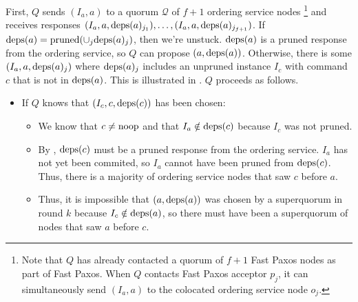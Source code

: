 First, $Q$ sends $(I_a, a)$ to a quorum $\mathcal{Q}$ of $f + 1$ ordering
service nodes%
\footnote{%
  Note that $Q$ has already contacted a quorum of $f + 1$ Fast Paxos nodes as
  part of Fast Paxos. When $Q$ contacts Fast Paxos acceptor $p_j$, it can
  simultaneously send $(I_a, a)$ to the colocated ordering service node $o_j$.
}
and receives responses $(I_a, a, \text{deps}(a)_{j_1}), \ldots, (I_a, a,
\text{deps}(a)_{j_{f+1}})$. If $\text{deps}(a) = \text{pruned}(\cup_j \text{deps}(a)_j)$, then we're
unstuck. $\text{deps}(a)$ is a pruned response from the ordering service, so $Q$ can
propose $(a, \text{deps}(a))$.
%
Otherwise, there is some $(I_a, a, \text{deps}(a)_j)$ where $\text{deps}(a)_j$ includes an
unpruned instance $I_c$ with command $c$ that is not in $\text{deps}(a)$. This is
illustrated in . $Q$ proceeds as follows.
\begin{itemize}
  \item
    If $Q$ knows that $(I_c, c, \text{deps}(c))$ has been chosen:
    \begin{itemize}
      \item
        We know that $c \neq \text{noop}$ and that $I_a \notin \text{deps}(c)$ because
        $I_c$ was not pruned.

      \item
        By , $\text{deps}(c)$ must be a pruned response
        from the ordering service. $I_a$ has not yet been commited, so $I_a$
        cannot have been pruned from $\text{deps}(c)$. Thus, there is a majority of
        ordering service nodes that saw $c$ before $a$.

      \item
        Thus, it is impossible that $(a, \text{deps}(a))$ was chosen by a superquorum
        in round $k$ because $I_c \notin \text{deps}(a)$, so there must have been a
        superquorum of nodes that saw $a$ before $c$.


\end{itemize}
\end{itemize}
